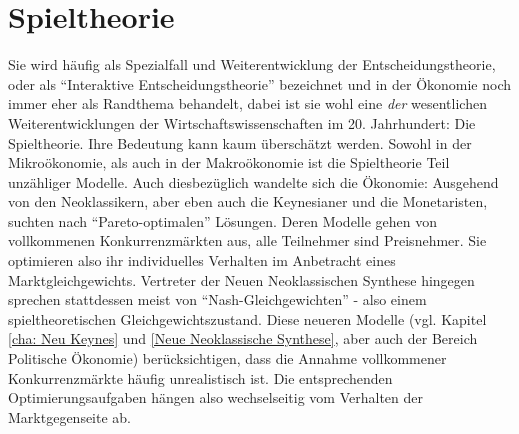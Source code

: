 %
%
%

\chapter{Spieltheorie} \label{cha: Spieltheorie}
\label{Spieltheorie}

Sie wird häufig als Spezialfall und Weiterentwicklung der Entscheidungstheorie, oder als "`Interaktive Entscheidungstheorie"' bezeichnet und in der Ökonomie noch immer eher als Randthema behandelt, dabei ist sie wohl eine \textit{der} wesentlichen Weiterentwicklungen der Wirtschaftswissenschaften im 20. Jahrhundert: Die Spieltheorie. Ihre Bedeutung kann kaum überschätzt werden. Sowohl in der Mikroökonomie, als auch in der Makroökonomie ist die Spieltheorie Teil unzähliger Modelle. Auch diesbezüglich wandelte sich die Ökonomie: Ausgehend von den Neoklassikern, aber eben auch die Keynesianer und die Monetaristen, suchten nach "`Pareto-optimalen"' Lösungen. Deren Modelle gehen von vollkommenen Konkurrenzmärkten aus, alle Teilnehmer sind Preisnehmer. Sie optimieren also ihr individuelles Verhalten im Anbetracht eines Marktgleichgewichts. Vertreter der Neuen Neoklassischen Synthese hingegen sprechen stattdessen meist von "`Nash-Gleichgewichten"' - also einem spieltheoretischen Gleichgewichtszustand.  Diese neueren Modelle (vgl. Kapitel \ref{cha: Neu Keynes} und \ref{Neue Neoklassische Synthese}, aber auch der Bereich Politische Ökonomie) berücksichtigen, dass die Annahme vollkommener Konkurrenzmärkte häufig unrealistisch ist. Die entsprechenden Optimierungsaufgaben hängen also wechselseitig vom Verhalten der Marktgegenseite ab. 

